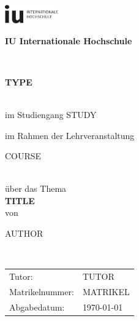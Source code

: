 \documentclass[11pt,oneside,titlepage,listof=totoc,bibliography=totoc]{scrartcl}
\newcommand{\myAutor}{{{ AUTHOR }}}
\newcommand{\myTitel}{{{ TITLE }}}
\newcommand{\myBetreuer}{{{ TUTOR }}}
\newcommand{\myLehrveranstaltung}{{{ COURSE }}}
\newcommand{\myMatrikelNr}{{{ MATRIKEL }}}
\newcommand{\myAbgabeDatum}{\today}
\newcommand{\myHochschulName}{IU Internationale Hochschule}
\newcommand{\myStudiengang}{{{ STUDY }}}
\newcommand{\myThesisArt}{{{ TYPE }}}
\begin{document}
\thispagestyle{empty}

\begin{titlepage}
	\begin{center}
    \includegraphics[width=2.3cm]{doc/assets/IULogo.png} \\
    \vspace{.5cm}
		\begin{Large}\textbf{\myHochschulName}\end{Large}\\
    \vspace{.5cm}
		\vspace{2cm}
    \begin{Large}\textbf{\myThesisArt}\end{Large}\\
    \vspace{.5cm}
    im Studiengang \myStudiengang
		\vspace{1.7cm}

		im Rahmen der Lehrveranstaltung\\
    \vspace{0.5cm}
		\begin{Large}{\myLehrveranstaltung}\end{Large}\\
		\vspace{1.8cm}
		über das Thema\\
    \vspace{0.5cm}
		\large{\textbf{\myTitel}}\\
		\vspace{2cm}
    von\\
    \vspace{0.5cm}
    \begin{Large}{\myAutor}\end{Large}\\
	\end{center}
	\normalsize
	\vfill
    \begin{tabular}{ l l }
        Tutor: & \myBetreuer\\
        Matrikelnummer: & \myMatrikelNr\\
        Abgabedatum: & \myAbgabeDatum
    \\
    \end{tabular}
\end{titlepage}
\end{document}
